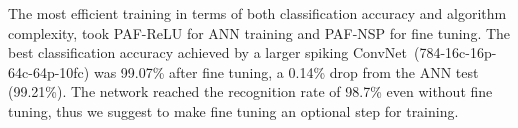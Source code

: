 	
	
	
	
	The most efficient training in terms of both classification accuracy and algorithm complexity, took PAF-ReLU for ANN training and PAF-NSP for fine tuning.
	The best classification accuracy achieved by a larger spiking ConvNet~(784-16c-16p-64c-64p-10fc) was 99.07\% after fine tuning, a 0.14\% drop from the ANN test (99.21\%).
	The network reached the recognition rate of 98.7\% even without fine tuning, thus we suggest to make fine tuning an optional step for training.
	
